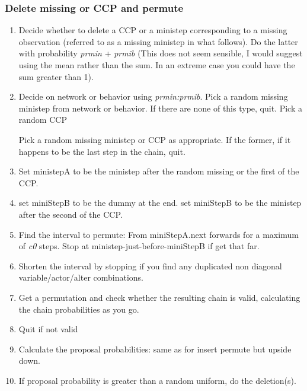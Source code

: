\documentclass[12pt,a4paper]{article}
\renewcommand{\=}{\,=\,}
\newcommand{\+}{\,+\,}
\newcommand{\nnm}[1]{\textsf{\small\textit{#1}}}
\begin{document}
\subsubsection{Delete missing or CCP and permute}
\begin{enumerate}
\item Decide whether to delete a CCP or a ministep corresponding to a missing
  observation (referred to as a missing ministep in what follows). Do the latter
  with probability \nnm{prmin} + \nnm{prmib} (This does not seem sensible, I
  would suggest using the mean rather than the sum. In an extreme case you could
  have the sum greater than 1).
\item \begin{algorithmic}
\STATE Decide on network or behavior using \nnm{prmin:prmib}.
\STATE Pick a random missing ministep from network or behavior.
\STATE If there are none of this type, quit.
\ELSE
\STATE Pick a random CCP
\ENDIF
\end{algorithmic}Pick a random missing ministep or CCP as appropriate. If the former, if it
  happens to be the last step in the chain, quit.
\item Set ministepA to be the ministep after the random missing or the first of
  the CCP.
\item \begin{algorithmic}
\STATE set miniStepB to be the dummy at the end.
\ELSE
\STATE set miniStepB to be the ministep after the second of the CCP.
\ENDIF
\end{algorithmic}
\item Find the interval to permute: From miniStepA.next forwards for a maximum
of \nnm{c0} steps. Stop at ministep-just-before-miniStepB if get that far.
\item Shorten the interval by stopping if you find any duplicated non diagonal
  variable/actor/alter combinations.
\item Get a permutation and check whether the resulting chain is valid,
  calculating the chain probabilities as you go.
\item Quit if not valid
\item Calculate the proposal probabilities: same as for insert permute but
  upside down.
\item If proposal probability is greater than a random uniform, do the
  deletion(s).
\end{enumerate}
\end{document}
